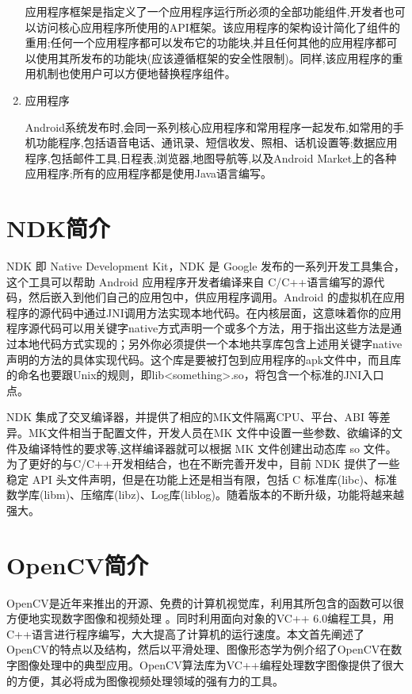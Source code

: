 \documentclass{XDBAthesis}
\begin{document}
\begin{enumerate}
 应用程序框架是指定义了一个应用程序运行所必须的全部功能组件,开发者也可以访问核心应用程序所使用的API框架。该应用程序的架构设计简化了组件的重用;任何一个应用程序都可以发布它的功能块,并且任何其他的应用程序都可以使用其所发布的功能块(应该遵循框架的安全性限制)。同样,该应用程序的重用机制也使用户可以方便地替换程序组件。
    \item 应用程序 

    Android系统发布时,会同一系列核心应用程序和常用程序一起发布,如常用的手机功能程序,包括语音电话、通讯录、短信收发、照相、话机设置等;数据应用程序,包括邮件工具,日程表,浏览器,地图导航等,以及Android Market上的各种应用程序;所有的应用程序都是使用Java语言编写。 
    
\end{enumerate}


\section{NDK简介}

   NDK 即 Native Development Kit，NDK 是 Google 发布的一系列开发工具集合，这个工具可以帮助 Android 应用程序开发者编译来自 C/C++语言编写的源代码，然后嵌入到他们自己的应用包中，供应用程序调用。Android 的虚拟机在应用程序的源代码中通过JNI调用方法实现本地代码。在内核层面，这意味着你的应用程序源代码可以用关键字native方式声明一个或多个方法，用于指出这些方法是通过本地代码方式实现的；另外你必须提供一个本地共享库包含上述用关键字native声明的方法的具体实现代码。这个库是要被打包到应用程序的apk文件中，而且库的命名也要跟Unix的规则，即lib<something>.so，将包含一个标准的JNI入口点。

   NDK 集成了交叉编译器，并提供了相应的MK文件隔离CPU、平台、ABI 等差异。MK文件相当于配置文件，开发人员在MK 文件中设置一些参数、欲编译的文件及编译特性的要求等,这样编译器就可以根据 MK 文件创建出动态库 so 文件。为了更好的与C/C++开发相结合，也在不断完善开发中，目前 NDK 提供了一些稳定 API 头文件声明，但是在功能上还是相当有限，包括 C 标准库(libc)、标准数学库(libm)、压缩库(libz)、Log库(liblog)。随着版本的不断升级，功能将越来越强大。

\section{OpenCV简介}

OpenCV是近年来推出的开源、免费的计算机视觉库，利用其所包含的函数可以很方便地实现数字图像和视频处理\cite{秦小文2011基于} 。同时利用面向对象的VC++ 6.0编程工具，用C++语言进行程序编写，大大提高了计算机的运行速度。本文首先阐述了OpenCV的特点以及结构，然后以平滑处理、图像形态学为例介绍了OpenCV在数字图像处理中的典型应用。OpenCV算法库为VC++编程处理数字图像提供了很大的方便，其必将成为图像视频处理领域的强有力的工具。
\end{document}
